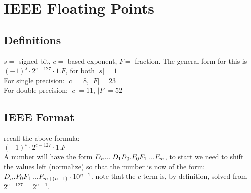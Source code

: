 \section{IEEE Floating Points}
\subsection*{Definitions}
$s = $ signed bit, $c =$ based exponent, $F =$ fraction. The general form
for this is $(-1)^s \cdot 2^{c - 127} \cdot 1.F$, for both $|s| = 1$\\
For single precision: $|c| = 8$, $|F| = 23$\\
For double precision: $|c| = 11$, $|F| = 52$\\

\subsection*{IEEE Format}
recall the above formula:\\
$(-1)^s \cdot 2^{c - 127} \cdot 1.F$\\
A number will have the form $D_n ... \hspace{1mm} D_1 D_0 . F_0 F_1 \hspace{1mm} ... F_m$,
to start we need to shift the values left (normalize) so that the number is now
of the form: $D_n . F_0 F_1 \hspace{1mm} ... F_{m + (n-1)} \cdot 10^{n-1}$.
note that the $c$ term is, by definition, solved from $2^{c - 127} = 2^{n-1}$.

